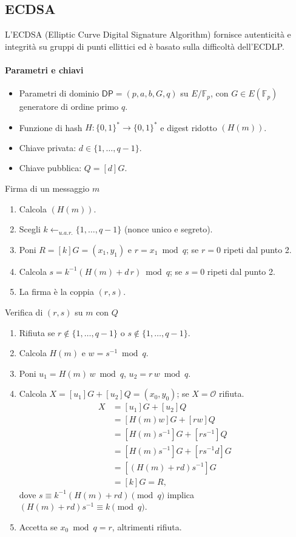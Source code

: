 \documentclass[a4paper, 11pt]{article}
\begin{document}
\subsection{ECDSA}

L'ECDSA (Elliptic Curve Digital Signature Algorithm) fornisce autenticità e integrità su gruppi di punti ellittici ed è basato sulla difficoltà dell'ECDLP.

\paragraph{Parametri e chiavi}
\begin{itemize}[itemsep=2pt, topsep=2pt]
    \item Parametri di dominio $\mathsf{DP}=(p,a,b,G,q)$ su $E/\mathbb{F}_p$, con $G\in E(\mathbb{F}_p)$ generatore di ordine primo $q$.
    \item Funzione di hash $H:\{0,1\}^*\to\{0,1\}^*$ e digest ridotto $(H(m))$.
    \item Chiave privata: $d\in\{1,\dots,q-1\}$.
    \item Chiave pubblica: $Q=[d]G$.
\end{itemize}

Firma di un messaggio $m$
\begin{enumerate}[itemsep=2pt, topsep=2pt]
    \item Calcola $(H(m))$.
    \item Scegli $k\gets_{u.a.r.}\{1,\dots,q-1\}$ (nonce unico e segreto).
    \item Poni $R=[k]G=(x_1,y_1)$ e $r=x_1 \bmod q$; se $r=0$ ripeti dal punto 2.
    \item Calcola $s=k^{-1}(H(m) + d\,r)\bmod q$; se $s=0$ ripeti dal punto 2.
    \item La firma è la coppia $(r,s)$.
\end{enumerate}

Verifica di $(r,s)$ su $m$ con $Q$
\begin{enumerate}[itemsep=2pt, topsep=2pt]
    \item Rifiuta se $r\notin\{1,\dots,q-1\}$ o $s\notin\{1,\dots,q-1\}$.
    \item Calcola $H(m)$ e $w=s^{-1}\bmod q$.
    \item Poni $u_1=H(m)\,w \bmod q$, $u_2=r\,w \bmod q$.
    \item Calcola $X=[u_1]G+[u_2]Q=(x_0,y_0)$; se $X=\mathcal{O}$ rifiuta.
    \[
    \begin{aligned}
    X &= [u_1]G+[u_2]Q \\
        &= [H(m)w]G + [rw]Q \\
        &= [H(m)s^{-1}]G + [rs^{-1}]Q \\
        &= [H(m)s^{-1}]G + [rs^{-1}d]G \\
        &= [(H(m)+rd)s^{-1}]G \\
        &= [k]G = R,
    \end{aligned}
    \]
    dove $s \equiv k^{-1}(H(m)+rd) \pmod q$ implica $(H(m)+rd)s^{-1}\equiv k \pmod q$.

    \item Accetta se $x_0 \bmod q = r$, altrimenti rifiuta.
\end{enumerate}
\end{document}
